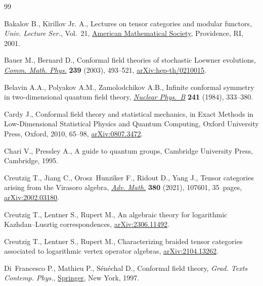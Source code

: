 \documentclass[pdftex]{sigma}
\numberwithin{equation}{section}
\begin{document}
\begin{thebibliography}{99}
\footnotesize\itemsep=0pt

Bakalov B., Kirillov Jr. A., Lectures on tensor categories and modular
 functors, \textit{Univ. Lecture Ser.}, Vol.~21,
 \href{https://doi.org/10.1090/ulect/021}{American Mathematical Society},
 Providence, RI, 2001.

Bauer M., Bernard D., Conformal field theories of stochastic {L}oewner
 evolutions, \href{https://doi.org/10.1007/s00220-003-0881-x}{\textit{Comm.
 Math. Phys.}} \textbf{239} (2003), 493--521,
 \href{http://arxiv.org/abs/hep-th/0210015}{arXiv:hep-th/0210015}.

Belavin A.A., Polyakov A.M., Zamolodchikov A.B., Infinite conformal symmetry in
 two-dimensional quantum field theory,
 \href{https://doi.org/10.1016/0550-3213(84)90052-X}{\textit{Nuclear Phys.~B}}
 \textbf{241} (1984), 333--380.

Cardy J., Conformal field theory and statistical mechanics, in Exact {M}ethods
 in {L}ow-{D}imensional {S}tatistical {P}hysics and {Q}uantum {C}omputing,
 Oxford University Press, Oxford, 2010, 65--98,
 \href{http://arxiv.org/abs/0807.3472}{arXiv:0807.3472}.

Chari V., Pressley A., A guide to quantum groups, Cambridge University Press,
 Cambridge, 1995.

Creutzig T., Jiang C., Orosz~Hunziker F., Ridout D., Yang J., Tensor categories
 arising from the {V}irasoro algebra,
 \href{https://doi.org/10.1016/j.aim.2021.107601}{\textit{Adv. Math.}}
 \textbf{380} (2021), 107601, 35~pages,
 \href{http://arxiv.org/abs/2002.03180}{arXiv:2002.03180}.

Creutzig T., Lentner S., Rupert M., An algebraic theory for logarithmic
 {K}azhdan--{L}usztig correspondences,
 \href{http://arxiv.org/abs/2306.11492}{arXiv:2306.11492}.

Creutzig T., Lentner S., Rupert M., Characterizing braided tensor categories
 associated to logarithmic vertex operator algebras,
 \href{http://arxiv.org/abs/2104.13262}{arXiv:2104.13262}.

Di~Francesco P., Mathieu P., S\'en\'echal D., Conformal field theory, \textit{Grad. Texts Contemp. Phys.},
 \href{https://doi.org/10.1007/978-1-4612-2256-9}{Springer}, New York, 1997.


\end{thebibliography}
\end{document}
